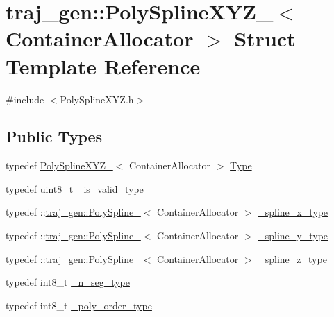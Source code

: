 \hypertarget{structtraj__gen_1_1_poly_spline_x_y_z__}{}\section{traj\+\_\+gen\+:\+:Poly\+Spline\+X\+Y\+Z\+\_\+$<$ Container\+Allocator $>$ Struct Template Reference}
\label{structtraj__gen_1_1_poly_spline_x_y_z__}


{\ttfamily \#include $<$Poly\+Spline\+X\+Y\+Z.\+h$>$}

\subsection*{Public Types}
\begin{DoxyCompactItemize}
\item 
typedef \hyperlink{structtraj__gen_1_1_poly_spline_x_y_z__}{Poly\+Spline\+X\+Y\+Z\+\_\+}$<$ Container\+Allocator $>$ \hyperlink{structtraj__gen_1_1_poly_spline_x_y_z___aa6abcb08736e40614837f5c2abe2969a}{Type}
\item 
typedef uint8\+\_\+t \hyperlink{structtraj__gen_1_1_poly_spline_x_y_z___aad18c8f3814cfb1c65ca0a3a068f8327}{\+\_\+is\+\_\+valid\+\_\+type}
\item 
typedef \+::\hyperlink{structtraj__gen_1_1_poly_spline__}{traj\+\_\+gen\+::\+Poly\+Spline\+\_\+}$<$ Container\+Allocator $>$ \hyperlink{structtraj__gen_1_1_poly_spline_x_y_z___abc3e93287ad8086e17f90af36bba6f1d}{\+\_\+spline\+\_\+x\+\_\+type}
\item 
typedef \+::\hyperlink{structtraj__gen_1_1_poly_spline__}{traj\+\_\+gen\+::\+Poly\+Spline\+\_\+}$<$ Container\+Allocator $>$ \hyperlink{structtraj__gen_1_1_poly_spline_x_y_z___aa5c2a1e4f6b1c2bef0e83a02a4850186}{\+\_\+spline\+\_\+y\+\_\+type}
\item 
typedef \+::\hyperlink{structtraj__gen_1_1_poly_spline__}{traj\+\_\+gen\+::\+Poly\+Spline\+\_\+}$<$ Container\+Allocator $>$ \hyperlink{structtraj__gen_1_1_poly_spline_x_y_z___ae11b69c7c197072da5371f58b07646b4}{\+\_\+spline\+\_\+z\+\_\+type}
\item 
typedef int8\+\_\+t \hyperlink{structtraj__gen_1_1_poly_spline_x_y_z___a452de517e162fa10990a02f034732870}{\+\_\+n\+\_\+seg\+\_\+type}
\item 
typedef int8\+\_\+t \hyperlink{structtraj__gen_1_1_poly_spline_x_y_z___a1f81e518c61dd409be0b2456eff1797b}{\+\_\+poly\+\_\+order\+\_\+type}
\item 

\end{DoxyCompactItemize}
